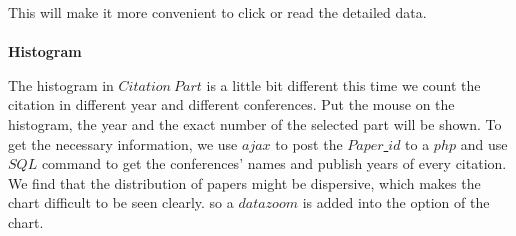 \documentclass{article}
\begin{document}
	\begin{figure}[H]
		\centering
		
	\end{figure}
	This will make it more convenient to click or read the detailed data.
	\\
	\\
	\textbf{Histogram}
	\par The histogram in \(Citation\ Part\) is a little bit different this time we count the citation in different year and different conferences. Put the mouse on the histogram, the year and the exact number of the selected part will be shown. To get the necessary information, we use \(ajax\) to post the \(Paper\)\underline{ }\(id\) to a \(php\) and use \(SQL\) command to get the conferences' names and publish years of every citation. We find that the distribution of papers might be dispersive, which makes the chart difficult to be seen clearly. so a \(datazoom\) is added into the option of the chart.
\end{document}
